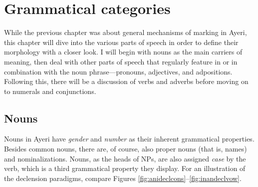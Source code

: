 
\chapter{Grammatical categories}

While the previous chapter was about general mechanisms of marking in Ayeri, 
this chapter will dive into the various parts of speech in order to define 
their morphology with a closer look. I will begin with nouns as the main 
carriers of meaning, then deal with other parts of speech that regularly 
feature in or in combination with the noun phrase---pronouns, adjectives, and 
adpositions. Following this, there will be a discussion of verbs and adverbs 
before moving on to numerals and conjunctions.

\section{Nouns}
\label{sec:nouns}

Nouns in Ayeri have \emph{gender} and \emph{number} as their inherent 
grammatical properties. Besides common nouns, there are, of course, also proper 
nouns (that is, names) and nominalizations. Nouns, as the heads of NPs, are 
also assigned \emph{case} by the verb, which is a third grammatical property 
they display. For an illustration of the declension paradigms, compare Figures 
\ref{fig:anideclcons}–\ref{fig:inandeclvow}.

